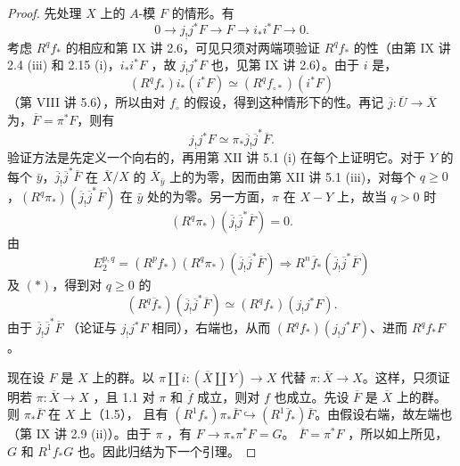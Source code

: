 \begin{proof}
先处理 $X$ 上的 $A$-模 $F$ 的情形。有
\[
0\longrightarrow j_!j^*F\longrightarrow F\longrightarrow i_*i^*F\longrightarrow0.
\]
考虑 $R^qf_*$ 的相应和第 IX 讲 2.6，可见只须对两端项验证 $R^qf_*$ 的性（由第 IX 讲 2.4 (iii) 和 2.15 (i)，$i_*i^*F$ ，故 $j_!j^*F$ 也，见第 IX 讲 2.6）。由于 $i$ 是，
\[
(R^qf_*)i_*(i^*F)\simeq(R^qf_{\circ*})(i^*F)
\]
（第 VIII 讲 5.6），所以由对 $f_\circ$ 的假设，得到这种情形下的性。再记 $\overline j:\overline U\to\overline X$ 为，$\overline F=\pi^*F$，则有
\[
j_!j^*F\simeq\pi_*\overline j_!\overline j^*\overline F.\tag{*}
\]
验证方法是先定义一个向右的，再用第 XII 讲 5.1 (i) 在每个上证明它。对于 $Y$ 的每个 $\bar y$，$\overline j_!\overline j^*\overline F$ 在 $\overline X/X$ 的 $\overline X_{\bar y}$ 上的为零，因而由第 XII 讲 5.1 (iii)，对每个 $q\geq0$，$(R^q\pi_*)(\overline j_!\overline j^*\overline F)$ 在 $\bar y$ 处的为零。另一方面，$\pi$ 在 $X-Y$ 上，故当 $q>0$ 时
\[
(R^q\pi_*)(\overline j_!\overline j^*\overline F)=0.
\]
由 
\[
E_2^{p,q}=(R^pf_*)(R^q\pi_*)(\overline j_!\overline j^*\overline F)
\Longrightarrow R^n\overline f_*(\overline j_!\overline j^*\overline F)
\]
及 $(*)$，得到对 $q\geq0$ 的
\[
(R^q\overline f_*)(\overline j_!\overline j^*\overline F)\simeq(R^qf_*)(j_!j^*F).
\]
由于 $\overline j_!\overline j^*\overline F$ （论证与 $j_!j^*F$ 相同），右端也，从而 $(R^qf_*)(j_!j^*F)$、进而 $R^qf_*F$ 。

现在设 $F$ 是 $X$ 上的群。以 $\pi\amalg i:(\overline X\amalg Y)\to X$ 代替 $\pi:\overline X\to X$。这样，只须证明若 $\pi:\overline X\to X$ ，且 1.1 对 $\pi$ 和 $\overline f$ 成立，则对 $f$ 也成立。先设 $\overline F$ 是 $\overline X$ 上的群。则 $\pi_*\overline F$ 在 $X$ 上（1.5），
且有 $(R^1f_*)\pi_*\overline F\hookrightarrow(R^1\overline f_*)\overline F$。由假设右端，故左端也（第 IX 讲 2.9 (ii)）。由于 $\pi$ ，有 $F\to\pi_*\pi^*F=G$。 $\overline F=\pi^*F$ ，所以如上所见，$G$ 和 $R^1f_*G$ 也。因此归结为下一个引理。
\end{proof}
